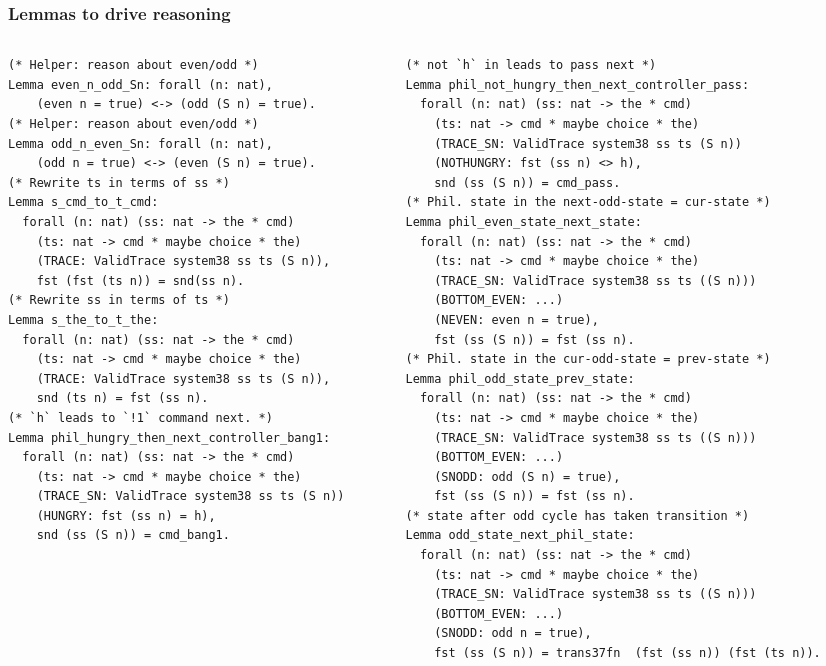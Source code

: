 \documentclass{beamer}
\begin{document}
\begin{frame}[fragile]
\frametitle{Lemmas to drive reasoning}

\begin{columns}[T] %
\begin{column}{.48\textwidth}
{\tiny
\begin{verbatim}
(* Helper: reason about even/odd *)
Lemma even_n_odd_Sn: forall (n: nat),
    (even n = true) <-> (odd (S n) = true).
(* Helper: reason about even/odd *)
Lemma odd_n_even_Sn: forall (n: nat),
    (odd n = true) <-> (even (S n) = true).
(* Rewrite ts in terms of ss *)
Lemma s_cmd_to_t_cmd: 
  forall (n: nat) (ss: nat -> the * cmd)
    (ts: nat -> cmd * maybe choice * the)
    (TRACE: ValidTrace system38 ss ts (S n)),
    fst (fst (ts n)) = snd(ss n).
(* Rewrite ss in terms of ts *)
Lemma s_the_to_t_the: 
  forall (n: nat) (ss: nat -> the * cmd)
    (ts: nat -> cmd * maybe choice * the)
    (TRACE: ValidTrace system38 ss ts (S n)),
    snd (ts n) = fst (ss n).
(* `h` leads to `!1` command next. *)
Lemma phil_hungry_then_next_controller_bang1:
  forall (n: nat) (ss: nat -> the * cmd)
    (ts: nat -> cmd * maybe choice * the)
    (TRACE_SN: ValidTrace system38 ss ts (S n))
    (HUNGRY: fst (ss n) = h),
    snd (ss (S n)) = cmd_bang1.
\end{verbatim}
}
\end{column}

\hfill
\begin{column}{.6\textwidth}
{\tiny
\begin{verbatim}
(* not `h` in leads to pass next *)
Lemma phil_not_hungry_then_next_controller_pass:
  forall (n: nat) (ss: nat -> the * cmd)
    (ts: nat -> cmd * maybe choice * the)
    (TRACE_SN: ValidTrace system38 ss ts (S n))
    (NOTHUNGRY: fst (ss n) <> h),
    snd (ss (S n)) = cmd_pass.
(* Phil. state in the next-odd-state = cur-state *)
Lemma phil_even_state_next_state:
  forall (n: nat) (ss: nat -> the * cmd)
    (ts: nat -> cmd * maybe choice * the)
    (TRACE_SN: ValidTrace system38 ss ts ((S n)))
    (BOTTOM_EVEN: ...)
    (NEVEN: even n = true),
    fst (ss (S n)) = fst (ss n).
(* Phil. state in the cur-odd-state = prev-state *)
Lemma phil_odd_state_prev_state:
  forall (n: nat) (ss: nat -> the * cmd)
    (ts: nat -> cmd * maybe choice * the)
    (TRACE_SN: ValidTrace system38 ss ts ((S n)))
    (BOTTOM_EVEN: ...)
    (SNODD: odd (S n) = true),
    fst (ss (S n)) = fst (ss n).
(* state after odd cycle has taken transition *)
Lemma odd_state_next_phil_state:
  forall (n: nat) (ss: nat -> the * cmd)
    (ts: nat -> cmd * maybe choice * the)
    (TRACE_SN: ValidTrace system38 ss ts ((S n)))
    (BOTTOM_EVEN: ...)
    (SNODD: odd n = true),
    fst (ss (S n)) = trans37fn  (fst (ss n)) (fst (ts n)). 
\end{verbatim}
}
\end{column}
\end{columns}
\end{frame}
\end{document}
